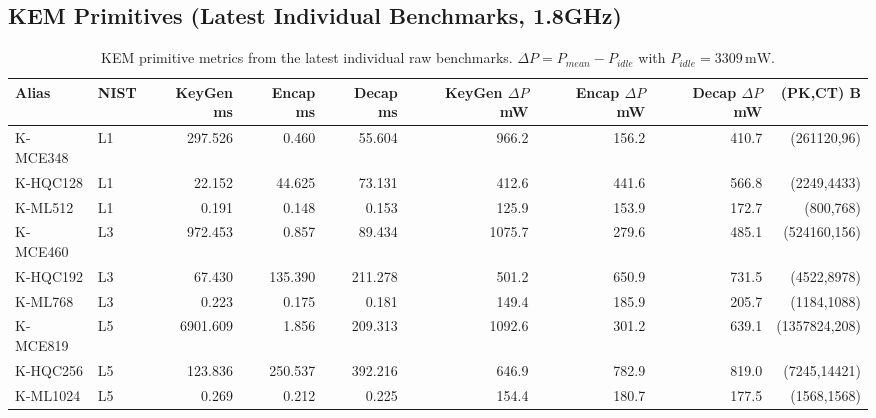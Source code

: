 
\subsection{KEM Primitives (Latest Individual Benchmarks, 1.8GHz)}
\begin{table}[t]
\centering
\caption{KEM primitive metrics from the latest individual raw benchmarks. $\Delta P = P_{mean}-P_{idle}$ with $P_{idle}=3309\,\mathrm{mW}$.}
\footnotesize
\setlength{\tabcolsep}{3pt}
\begin{tabular}{@{}llrrrrrrr@{}}\toprule
Alias & NIST & KeyGen ms & Encap ms & Decap ms & KeyGen $\Delta P$ mW & Encap $\Delta P$ mW & Decap $\Delta P$ mW & (PK,CT) B \\ \midrule
K-MCE348 & L1 & 297.526 & 0.460 & 55.604 & 966.2 & 156.2 & 410.7 & (261120,96) \\
K-HQC128 & L1 & 22.152 & 44.625 & 73.131 & 412.6 & 441.6 & 566.8 & (2249,4433) \\
K-ML512 & L1 & 0.191 & 0.148 & 0.153 & 125.9 & 153.9 & 172.7 & (800,768) \\
K-MCE460 & L3 & 972.453 & 0.857 & 89.434 & 1075.7 & 279.6 & 485.1 & (524160,156) \\
K-HQC192 & L3 & 67.430 & 135.390 & 211.278 & 501.2 & 650.9 & 731.5 & (4522,8978) \\
K-ML768 & L3 & 0.223 & 0.175 & 0.181 & 149.4 & 185.9 & 205.7 & (1184,1088) \\
K-MCE819 & L5 & 6901.609 & 1.856 & 209.313 & 1092.6 & 301.2 & 639.1 & (1357824,208) \\
K-HQC256 & L5 & 123.836 & 250.537 & 392.216 & 646.9 & 782.9 & 819.0 & (7245,14421) \\
K-ML1024 & L5 & 0.269 & 0.212 & 0.225 & 154.4 & 180.7 & 177.5 & (1568,1568) \\
\bottomrule\end{tabular}
\label{tab:kem-primitives-latest-manual}
\end{table}

